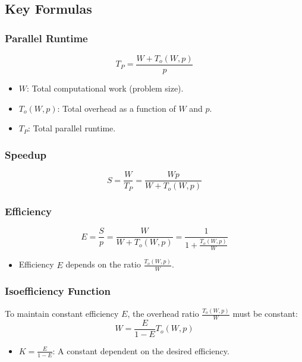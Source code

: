 \documentclass[12pt,a4paper]{article}
\begin{document}
\subsection{Key Formulas}
\subsubsection{Parallel Runtime}
\begin{equation}
T_P = \frac{W + T_o(W, p)}{p}
\end{equation}
\begin{itemize}
    \item $W$: Total computational work (problem size).
    \item $T_o(W, p)$: Total overhead as a function of $W$ and $p$.
    \item $T_P$: Total parallel runtime.
\end{itemize}

\subsubsection{Speedup}
\begin{equation}
S = \frac{W}{T_P} = \frac{Wp}{W + T_o(W, p)}
\end{equation}

\subsubsection{Efficiency}
\begin{equation}
E = \frac{S}{p} = \frac{W}{W + T_o(W, p)} = \frac{1}{1 + \frac{T_o(W, p)}{W}}
\end{equation}
\begin{itemize}
    \item Efficiency $E$ depends on the ratio $\frac{T_o(W, p)}{W}$.
\end{itemize}

\subsubsection{Isoefficiency Function}
To maintain constant efficiency $E$, the overhead ratio $\frac{T_o(W, p)}{W}$ must be constant:
\begin{equation}
W = \frac{E}{1 - E} T_o(W, p)
\end{equation}
\begin{itemize}
    \item $K = \frac{E}{1 - E}$: A constant dependent on the desired efficiency.
\end{itemize}
\end{document}
